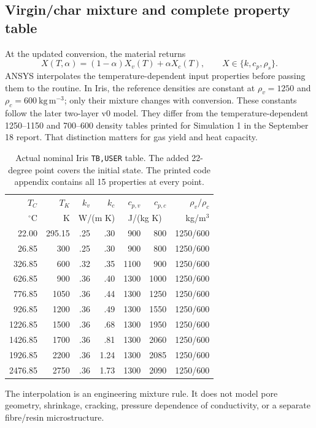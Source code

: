 \subsection{Virgin/char mixture and complete property table}
At the updated conversion, the material returns
\begin{equation}
 X(T,\alpha)=(1-\alpha)X_v(T)+\alpha X_c(T),\qquad X\in\{k,c_p,\rho_s\}.
\end{equation}
ANSYS interpolates the temperature-dependent input properties before passing them to the routine. In Iris, the reference densities are constant at $\rho_v=1250$ and $\rho_c=600\ \mathrm{kg\,m^{-3}}$; only their mixture changes with conversion. These constants follow the later two-layer v0 model. They differ from the temperature-dependent 1250--1150 and 700--600 density tables printed for Simulation 1 in the September 18 report. That distinction matters for gas yield and heat capacity.
\begin{table}[H]\centering\small
\begin{tabular}{rrrrrrr}\toprule
$T_C$ & $T_K$ & $k_v$ & $k_c$ & $c_{p,v}$ & $c_{p,c}$ & $\rho_v/\rho_c$\\
$^\circ$C & K & \multicolumn{2}{c}{W/(m K)} & \multicolumn{2}{c}{J/(kg K)} & kg/m$^3$\\\midrule
22.00 & 295.15 & .25 & .30 & 900 & 800 & 1250/600\\
26.85 & 300 & .25 & .30 & 900 & 800 & 1250/600\\
326.85 & 600 & .32 & .35 & 1100 & 900 & 1250/600\\
626.85 & 900 & .36 & .40 & 1300 & 1000 & 1250/600\\
776.85 & 1050 & .36 & .44 & 1300 & 1250 & 1250/600\\
926.85 & 1200 & .36 & .49 & 1300 & 1550 & 1250/600\\
1226.85 & 1500 & .36 & .68 & 1300 & 1950 & 1250/600\\
1426.85 & 1700 & .36 & .81 & 1300 & 2060 & 1250/600\\
1926.85 & 2200 & .36 & 1.24 & 1300 & 2085 & 1250/600\\
2476.85 & 2750 & .36 & 1.73 & 1300 & 2090 & 1250/600\\\bottomrule
\end{tabular}\caption{Actual nominal Iris \texttt{TB,USER} table. The added 22-degree point covers the initial state. The printed code appendix contains all 15 properties at every point.}\end{table}
The interpolation is an engineering mixture rule. It does not model pore geometry, shrinkage, cracking, pressure dependence of conductivity, or a separate fibre/resin microstructure.


